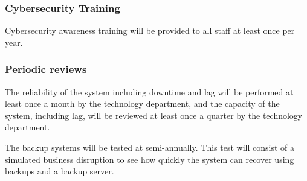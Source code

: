 \subsubsection{Cybersecurity Training}
Cybersecurity awareness training will be provided to all staff at
least once per year.

\subsubsection{Periodic reviews}

The reliability of the system including downtime and lag will be
performed at least once a month by the technology department, and the
capacity of the system, including lag, will be reviewed at least once a
quarter by the technology department.

The backup systems will be tested at semi-annually.  This test will
consist of a simulated business disruption to see how quickly the
system can recover using backups and a backup server.

